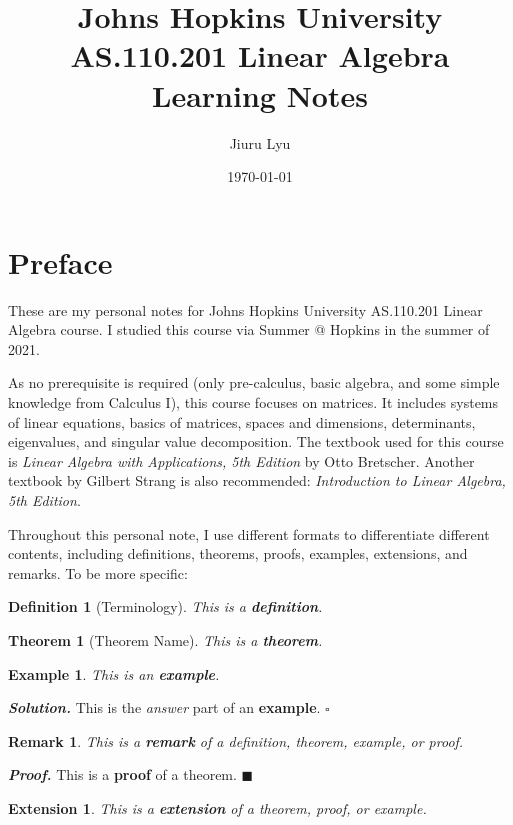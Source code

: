 \documentclass[12pt, a4paper]{article}
\title{Johns Hopkins University\\\textbf{AS.110.201 Linear Algebra}\\Learning Notes}
\author{Jiuru Lyu}
\date{\today}
\newtheorem{thm}{Theorem}[subsection]
\newtheorem{df}{Definition}[subsection]
\newtheorem{eg}{Example}[subsection]
\newtheorem*{rmk}{\indent Remark}
\newenvironment*{sol}{\par\indent\textbf{\textit{Solution. }}}{\hfill{$\square$}\par}
\newenvironment*{prf}{\par\indent\textbf{\textit{Proof. }}}{\hfill $\blacksquare$\par}
\newtheorem*{ext}{\indent Extension}
\begin{document}
\maketitle

\tableofcontents

\newpage
\section*{Preface}
These are my personal notes for Johns Hopkins University AS.110.201 Linear Algebra course. I studied this course via Summer @ Hopkins in the summer of 2021. 

As no prerequisite is required (only pre-calculus, basic algebra, and some simple knowledge from Calculus I), this course focuses on matrices. It includes systems of linear equations, basics of matrices, spaces and dimensions, determinants, eigenvalues, and singular value decomposition. The textbook used for this course is \textit{Linear Algebra with Applications, 5th Edition} by Otto Bretscher. Another textbook by Gilbert Strang is also recommended: \textit{Introduction to Linear Algebra, 5th Edition}. 

Throughout this personal note, I use different formats to differentiate different contents, including definitions, theorems, proofs, examples, extensions, and remarks. To be more specific: 
\begin{df}[Terminology]
    This is a \textbf{definition}.	
\end{df}
\begin{thm}[Theorem Name]
    This is a \textbf{theorem}.	
\end{thm}
\begin{eg}
    This is  an \textbf{example}. 
\end{eg}

\begin{sol}
    This is the \textit{answer} part of an \textbf{example}. 
\end{sol}
\begin{rmk}
	This is a \textbf{remark} of a definition, theorem, example, or proof. 
\end{rmk}

\begin{prf}
	This is a \textbf{proof} of a theorem. 
\end{prf}
\begin{ext}
	This is a \textbf{extension} of a theorem, proof, or example. 	
\end{ext}
\end{document}
